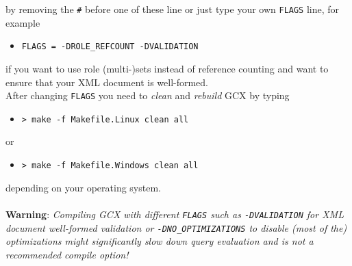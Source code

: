 \noindent by removing the \texttt{\#} before one of these line or just type your own \texttt{FLAGS} line, for example \begin{itemize}
  \setlength{\itemsep}{0pt}
  \item[] \texttt{FLAGS = -DROLE\_REFCOUNT -DVALIDATION}
\end{itemize}

\noindent if you want to use role (multi-)sets instead of reference counting and want to ensure that your XML document is well-formed. \\

\noindent After changing \texttt{FLAGS} you need to \emph{clean} and \emph{rebuild} GCX by typing
\begin{itemize}
  \setlength{\itemsep}{0pt}
  \item[] \texttt{> make -f Makefile.Linux clean all}
\end{itemize}

\noindent or
\begin{itemize}
  \setlength{\itemsep}{0pt}
  \item[] \texttt{> make -f Makefile.Windows clean all}
\end{itemize}

\noindent depending on your operating system. \\ \\

\textbf{Warning}: \emph{Compiling GCX with different \texttt{FLAGS} such as \texttt{-DVALIDATION} for XML document well-formed validation or \texttt{-DNO\_OPTIMIZATIONS} to disable (most of the) optimizations might significantly slow down query evaluation and is not a recommended compile option!}
